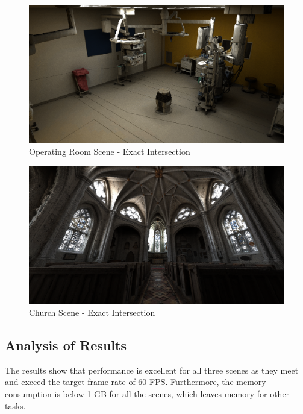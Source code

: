 \documentclass[12pt]{article}
\begin{document}
\begin{figure}[H]
    \begin{center}
        \includegraphics[scale=0.25]{OperationRoom}
    \end{center}
    \caption{Operating Room Scene - Exact Intersection}
    \label{fig:OperationRoom}
\end{figure}

\begin{figure}[H]
    \begin{center}
        \includegraphics[scale=0.25]{Church}
    \end{center}
    \caption{Church Scene - Exact Intersection}
    \label{fig:Church}
\end{figure}


\subsection{Analysis of Results}

The results show that performance is excellent for all three scenes as they meet and exceed the target frame rate of 60 FPS.
Furthermore, the memory consumption is below 1 GB for all the scenes, which leaves memory for other tasks.
\end{document}
